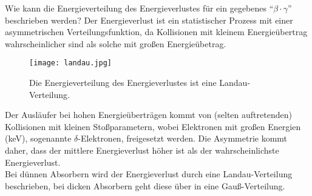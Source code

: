 \FloatBarrier
Wie kann die Energieverteilung des Energieverlustes für ein gegebenes "`$\beta\cdot\gamma$"' beschrieben
werden? Der Energieverlust ist ein statistischer Prozess mit einer asymmetrischen
Verteilungsfunktion, da Kollisionen mit kleinem Energieübertrag wahrscheinlicher sind als solche
mit großen Energieübetrag.

\begin{figure}
	\centering
	\texttt{[image: landau.jpg]}
	\caption{Die Energieverteilung des Energieverlustes ist eine Landau-Verteilung.}
	\label{}
\end{figure}

Der Ausläufer bei hohen Energieüberträgen kommt von (selten auftretenden) Kollisionen mit kleinen
Stoßparametern, wobei Elektronen mit großen Ener\-gien (keV), sogenannte $\delta$-Elektronen,
freigesetzt werden. Die Asymmetrie kommt daher, dass der mittlere Energieverlust höher
ist als der wahrscheinlichste Energieverlust.
\\
Bei dünnen Absorbern wird der Energieverlust durch eine Landau-Verteilung beschrieben, bei dicken
Absorbern geht diese über in eine Gauß-Verteilung.

\FloatBarrier